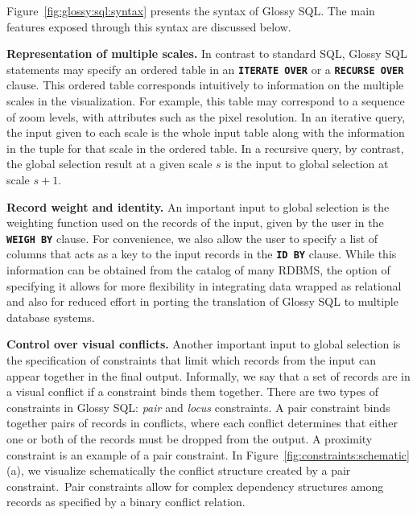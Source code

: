\documentclass[11pt, oneside]{report}
\newcommand{\minisec}[1]{\noindent\textbf{#1.}}
\begin{document}
{Figure~\ref{fig:glossy:sql:syntax} presents the syntax of Glossy SQL. The main features exposed through this syntax are discussed below. 

 \minisec{Representation of multiple scales} 
In contrast to standard SQL, Glossy SQL statements may specify an ordered table in an \textbf{\texttt{ITERATE OVER}} or a \textbf{\texttt{RECURSE OVER}} clause. This ordered table corresponds intuitively to information on the multiple scales in the visualization. For example, this table may correspond to a sequence of zoom levels, with attributes such as the pixel resolution. In an iterative query, the input given to each scale is the whole input table along with the information in the tuple for that scale in the ordered table. In a recursive query, by contrast, the global selection result at a given scale $s$ is the input to global selection at scale $s+1$.  

\minisec{Record weight and identity}
An important input to global selection is the weighting function used on the records of the input, given by the user in the \textbf{\texttt{WEIGH BY}} clause. For convenience, we also allow the user to specify a list of columns that acts as a key to the input records in the \textbf{\texttt{ID BY}} clause. While this information can be obtained from the catalog of many RDBMS, the option of specifying it allows for more flexibility in integrating data wrapped as relational and also for reduced effort in porting the translation of Glossy SQL to multiple database systems. 

\minisec{Control over visual conflicts}
Another important input to global selection is the specification of constraints that limit which records from the input can appear together in the final output. Informally, we say that a set of records are in a visual conflict if a constraint binds them together. There are two types of constraints in Glossy SQL: \emph{pair} and \emph{locus} constraints. A pair constraint binds together pairs of records in conflicts, where each conflict determines that either one or both of the records must be dropped from the output. A proximity constraint is an example of a pair constraint. In Figure~\ref{fig:constraints:schematic}(a), we visualize schematically the conflict structure created by a pair constraint.~Pair constraints allow for complex dependency structures among records as specified by a binary conflict relation.  

}
\end{document}
